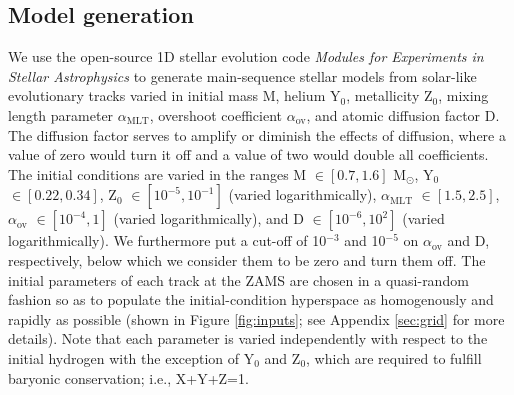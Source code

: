 \documentclass[manuscript]{aastex}
\begin{document}
\subsection{Model generation}
\label{sec:models}
We use the open-source 1D stellar evolution code \emph{Modules for Experiments in Stellar Astrophysics} \citep[MESA,][]{Paxton2011} to generate main-sequence stellar models from solar-like evolutionary tracks varied in initial mass M, helium Y$_0$, metallicity Z$_0$, mixing length parameter $\alpha_{\text{MLT}}$, overshoot coefficient $\alpha_{\text{ov}}$, and atomic diffusion factor D. The diffusion factor serves to amplify or diminish the effects of diffusion, where a value of zero would turn it off and a value of two would double all coefficients. The initial conditions are varied in the ranges M $\in [0.7, 1.6]$ M$_\odot$, Y$_0$ $\in [0.22, 0.34]$, Z$_0$ $\in [10^{-5}, 10^{-1}]$ (varied logarithmically), $\alpha_{\text{MLT}}$ $\in [1.5, 2.5]$, $\alpha_{\text{ov}}$ $\in [10^{-4}, 1]$ (varied logarithmically), and D $\in [10^{-6}, 10^2]$ (varied logarithmically). We furthermore put a cut-off of 10$^{-3}$ and 10$^{-5}$ on $\alpha_{\text{ov}}$ and D, respectively, below which we consider them to be zero and turn them off. The initial parameters of each track at the ZAMS are chosen in a quasi-random fashion so as to populate the initial-condition hyperspace as homogenously and rapidly as possible (shown in Figure \ref{fig:inputs}; see Appendix \ref{sec:grid} for more details). Note that each parameter is varied independently with respect to the initial hydrogen with the exception of Y$_0$ and Z$_0$, which are required to fulfill baryonic conservation; i.e., X+Y+Z=1. 
\end{document}
